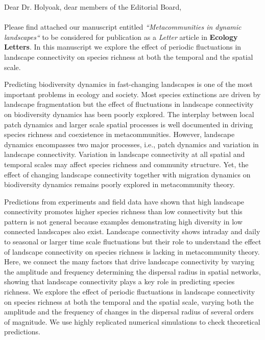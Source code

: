 \documentclass{article}
\begin{document}
\parskip 6pt
\baselineskip 12pt
\noindent Dear Dr. Holyoak, dear members of the Editorial Board,\\
\\

Please find attached our manuscript entitled \emph{``Metacommunities in dynamic landscapes``} to be considered for publication as a \emph{Letter} article in \textbf{Ecology Letters}. In this manuscript we explore the effect of periodic fluctuations in landscape connectivity on species richness at both the temporal and the spatial scale. 

Predicting biodiversity dynamics in fast-changing landscapes is one of the most important problems in ecology and society. Most species extinctions are driven by landscape fragmentation but the effect of fluctuations in landscape connectivity on biodiversity dynamics has been poorly explored. The interplay between local patch dynamics and larger scale spatial processes is well documented in driving species richness and coexistence in metacommunities. However, landscape dynamics encompasses two major processes, i.e., patch dynamics and variation in landscape connectivity. Variation in landscape connectivity at all spatial and temporal scales may affect species richness and community structure. Yet, the effect of changing landscape connectivity together with migration dynamics on biodiversity dynamics remains poorly explored in metacommunity theory.

Predictions from experiments and field data have shown that high landscape connectivity promotes higher species richness than low connectivity but this pattern is not general because examples demonstrating high diversity in low connected landscapes also exist. Landscape connectivity shows intraday and daily to seasonal or larger time scale fluctuations but their role to understand the effect of landscape connectivity on species richness is lacking in metacommunity theory. Here, we connect the many factors that drive landscape connectivity by varying the amplitude and frequency determining the dispersal radius in spatial networks, showing that landscape connectivity plays a key role in predicting species richness. We explore the effect of periodic fluctuations in landscape connectivity on species richness at both the temporal and the spatial scale, varying both the amplitude and the frequency of changes in the dispersal radius of several orders of magnitude. We use highly replicated numerical simulations to check theoretical predictions.
\end{document}
